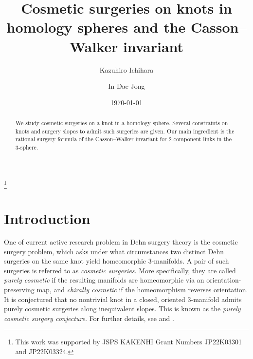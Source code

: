 \documentclass{amsart}
\theoremstyle{remark}
\begin{document}
\title[Cosmetic surgeries on knots in homology spheres]{Cosmetic surgeries on knots in homology spheres and the Casson--Walker invariant}


\author{Kazuhiro Ichihara}
\address{Department of Mathematics, College of Humanities and Sciences, Nihon University, 3-25-40 Sakurajosui, Setagaya-ku, Tokyo 156-8550, JAPAN}

\author{In Dae Jong}
\address{Department of Mathematics, Kindai University, 3-4-1 Kowakae, Higashiosaka City, Osaka 577-0818, Japan} 


\date{\today}



\thanks{This work was supported by JSPS KAKENHI Grant Numbers JP22K03301 and JP22K03324.}

\begin{abstract}
We study cosmetic surgeries on a knot in a homology sphere. 
Several constraints on knots and surgery slopes to admit such surgeries are given. Our main ingredient is the rational surgery formula of the Casson--Walker invariant for 2-component links in the 3-sphere. 
\end{abstract}

\maketitle


\section{Introduction}

One of current active research problem in Dehn surgery theory is the cosmetic surgery problem, which asks under what circumstances two distinct Dehn surgeries on the same knot yield homeomorphic 3-manifolds.
A pair of such surgeries is referred to as \textit{cosmetic surgeries}.
More specifically, they are called \textit{purely cosmetic} if the resulting manifolds are homeomorphic via an orientation-preserving map, and \textit{chirally cosmetic} if the homeomorphism reverses orientation.
It is conjectured that no nontrivial knot in a closed, oriented 3-manifold admits purely cosmetic surgeries along inequivalent slopes.
This is known as the \textit{purely cosmetic surgery conjecture}.
For further details, see \cite{BleilerHodgsonWeeks} and \cite[Problem 1.81A]{Kirby}.
\end{document}
